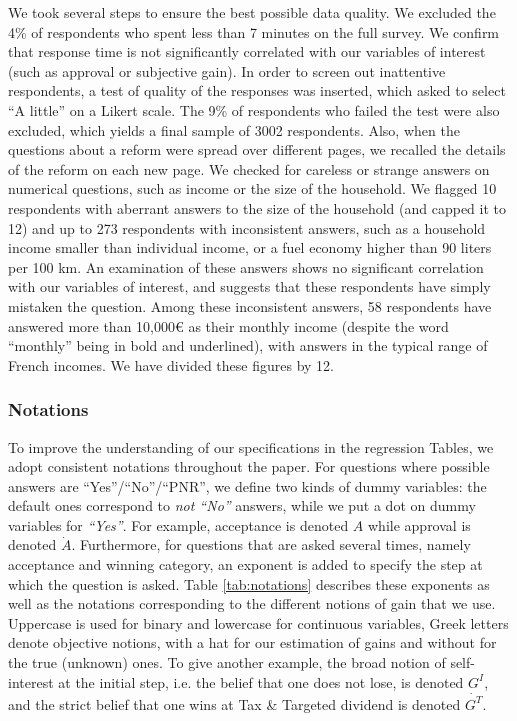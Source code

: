 \documentclass[12pt]{article} %
\providecommand{\DIFaddtex}[1]{{\protect\color{blue}\uwave{#1}}} %
\providecommand{\DIFaddbegin}{} %
\providecommand{\DIFaddend}{} %
\providecommand{\DIFadd}[1]{\texorpdfstring{\DIFaddtex{#1}}{#1}} %
\newcommand{\DIFaddincludegraphics}[2][]{{\color{blue}\fbox{\DIFOincludegraphics[#1]{#2}}}} %
\DeclareRobustCommand{\DIFaddbegin}{\DIFOaddbegin \let\includegraphics\DIFaddincludegraphics} %
\DeclareRobustCommand{\DIFaddend}{\DIFOaddend \let\includegraphics\DIFOincludegraphics} %
\begin{document}
We took several steps to ensure the best possible data quality. We excluded the 4\% of respondents who spent less than 7 minutes on the full survey. We confirm that response time is not significantly correlated with our variables of interest (such as approval or subjective gain). In order to screen out inattentive respondents, a test of quality of the responses was inserted, which asked to select ``A little'' on a Likert scale. The 9\% of respondents who failed the test were also excluded, which yields a final sample of 3002 respondents. Also, when the questions about a reform were spread over different pages, we recalled the details of the reform on each new page. We checked for careless or strange answers on numerical questions, such as income or the size of the household. We flagged 10 respondents with aberrant answers to the size of the household (and capped it to 12) and up to 273 respondents with inconsistent answers, such as a household income smaller than individual income, or a fuel economy higher than 90 liters per 100 km. An examination of these answers shows no significant correlation with our variables of interest, and suggests that these respondents have simply mistaken the question. Among these inconsistent answers, 58 respondents have answered more than 10,000\euro{} as their monthly income (despite the word ``monthly'' being in bold and underlined), with answers in the typical range of French \DIFaddbegin \DIFadd{annual }\DIFaddend incomes. We have divided these figures by 12.

\subsubsection{Notations}

To improve the understanding of our specifications in the regression Tables, we adopt consistent notations throughout the paper. For questions where possible answers are ``Yes''/``No''/``PNR'', we define two kinds of dummy variables: the default ones correspond to \textit{not ``No''} answers, while we put a dot on dummy variables for \textit{``Yes''}. For example, acceptance is denoted $A$ while approval is denoted $\dot{A}$. Furthermore, for questions that are asked several times, namely acceptance and winning category, an exponent is added to specify the step at which the question is asked. Table \ref{tab:notations} describes these exponents as well as the notations corresponding to the different notions of gain that we use. Uppercase is used for binary and lowercase for continuous variables, Greek letters denote objective notions, with a hat for our estimation of gains and without for the true (unknown) ones. To give another example, the broad notion of self-interest at the initial step, i.e. the belief that one does not lose, is denoted $G^I$, and the strict belief that one wins at Tax \& Targeted dividend is denoted $\dot{G^T}$.
\end{document}
